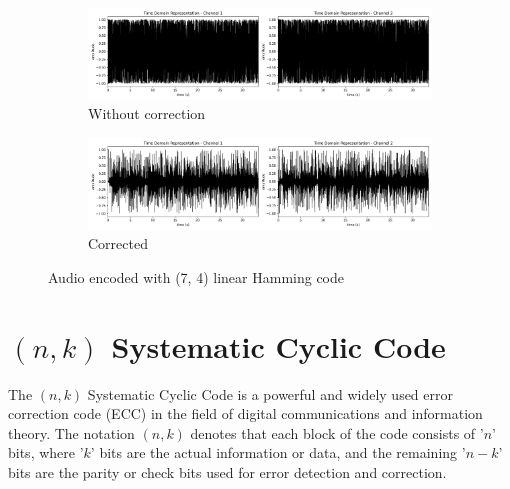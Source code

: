 \documentclass{article}
\begin{document}
\begin{figure}[htb]
    \centering
    \begin{subfigure}[b]{\textwidth}
        \centering
        \includegraphics[width=\textwidth]{../Result/Linear/linear-bsc-wav-time-domain-RX.png}
        \caption{Without correction}
        \label{fig:t-audio-linear-no-correction}
    \end{subfigure}
    \begin{subfigure}[b]{\textwidth}
        \centering
        \includegraphics[width=\textwidth]{../Result/Linear/linear-bsc-wav-time-domain-RX-syndrome-corrected.png}
        \caption{Corrected}
        \label{fig:t-audio-linear-syndrome-corrected}
    \end{subfigure}
       \caption{Audio encoded with (7, 4) linear Hamming code}
       \label{fig:t-audio-linear}
\end{figure}



\section{$(n,k)$ Systematic Cyclic Code}
The $(n,k)$ Systematic Cyclic Code is a powerful and widely used error correction code (ECC) in the field of digital communications and information theory. The notation $(n,k)$ denotes that each block of the code consists of '$n$' bits, where '$k$' bits are the actual information or data, and the remaining '$n-k$' bits are the parity or check bits used for error detection and correction.
\end{document}
